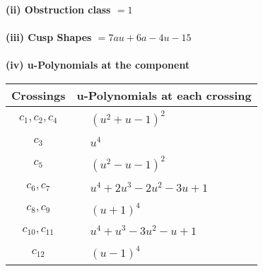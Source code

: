\documentclass[1p]{elsarticle_modified}
\theoremstyle{definition}
\begin{document}
\flushleft \textbf{(ii) Obstruction class $= 1$}\\~\\
\flushleft \textbf{(iii) Cusp Shapes $= 7 a u+6 a-4 u-15$}\\~\\
\newpage\renewcommand{\arraystretch}{1}
\flushleft \textbf{(iv) u-Polynomials at the component}\newline \\
\begin{tabular}{m{50pt}|m{274pt}}
Crossings & \hspace{64pt}u-Polynomials at each crossing \\
\hline $$\begin{aligned}c_{1},c_{2},c_{4}\end{aligned}$$&$\begin{aligned}
&(u^2+u-1)^2
\end{aligned}$\\
\hline $$\begin{aligned}c_{3}\end{aligned}$$&$\begin{aligned}
&u^4
\end{aligned}$\\
\hline $$\begin{aligned}c_{5}\end{aligned}$$&$\begin{aligned}
&(u^2- u-1)^2
\end{aligned}$\\
\hline $$\begin{aligned}c_{6},c_{7}\end{aligned}$$&$\begin{aligned}
&u^4+2 u^3-2 u^2-3 u+1
\end{aligned}$\\
\hline $$\begin{aligned}c_{8},c_{9}\end{aligned}$$&$\begin{aligned}
&(u+1)^4
\end{aligned}$\\
\hline $$\begin{aligned}c_{10},c_{11}\end{aligned}$$&$\begin{aligned}
&u^4+u^3-3 u^2- u+1
\end{aligned}$\\
\hline $$\begin{aligned}c_{12}\end{aligned}$$&$\begin{aligned}
&(u-1)^4
\end{aligned}$\\
\hline
\end{tabular}\\~\\
\end{document}
